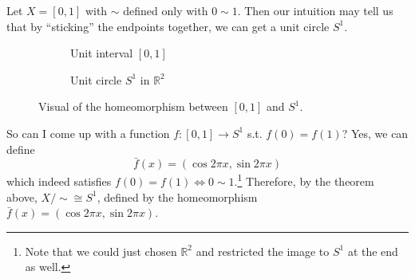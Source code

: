     \begin{example}[1-Sphere]
      Let $X = [0, 1]$ with $\sim$ defined only with $0 \sim 1$. Then our intuition may tell us that by ``sticking'' the endpoints together, we can get a unit circle $S^1$. 

      \begin{figure}[H]
        \centering
        \begin{subfigure}[b]{0.48\textwidth}
          \centering
          \caption{Unit interval $[0, 1]$}
          \label{fig:unit-interval}
        \end{subfigure}
        \hfill 
        \begin{subfigure}[b]{0.48\textwidth}
          \centering
          \caption{Unit circle $S^1$ in $\mathbb{R}^2$}
          \label{fig:unit-circle}
        \end{subfigure}
        \caption{Visual of the homeomorphism between $[0, 1]$ and $S^1$.}
        \label{fig:comparison}
      \end{figure}

      So can I come up with a function $f: [0, 1] \rightarrow S^1$ s.t. $f(0) = f(1)$? Yes, we can define 
      \begin{equation}
        \bar{f}(x) = (\cos{2 \pi x}, \sin{2\pi x})
      \end{equation} 
      which indeed satisfies $f(0) = f(1) \iff 0 \sim 1$.\footnote{Note that we could just chosen $\mathbb{R}^2$ and restricted the image to $S^1$ at the end as well.} Therefore, by the theorem above, $X/{\sim} \cong S^1$, defined by the homeomorphism $\bar{f}(x) = (\cos{2 \pi x}, \sin{2\pi x})$.  
    \end{example}

